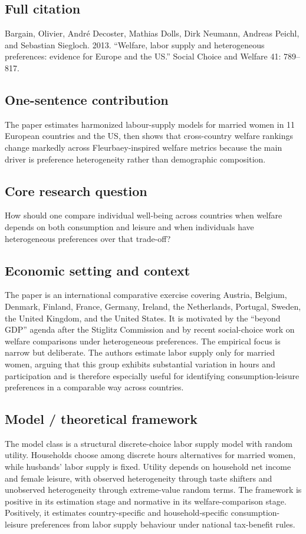 \documentclass[11pt,a4paper]{article}
\begin{document}
\subsection*{Full citation}
Bargain, Olivier, André Decoster, Mathias Dolls, Dirk Neumann, Andreas Peichl, and Sebastian Siegloch. 2013. “Welfare, labor supply and heterogeneous preferences: evidence for Europe and the US.” Social Choice and Welfare 41: 789–817.

\subsection*{One-sentence contribution}
The paper estimates harmonized labour-supply models for married women in 11 European countries and the US, then shows that cross-country welfare rankings change markedly across Fleurbaey-inspired welfare metrics because the main driver is preference heterogeneity rather than demographic composition.

\subsection*{Core research question}
How should one compare individual well-being across countries when welfare depends on both consumption and leisure and when individuals have heterogeneous preferences over that trade-off?

\subsection*{Economic setting and context}
The paper is an international comparative exercise covering Austria, Belgium, Denmark, Finland, France, Germany, Ireland, the Netherlands, Portugal, Sweden, the United Kingdom, and the United States. It is motivated by the “beyond GDP” agenda after the Stiglitz Commission and by recent social-choice work on welfare comparisons under heterogeneous preferences. The empirical focus is narrow but deliberate. The authors estimate labor supply only for married women, arguing that this group exhibits substantial variation in hours and participation and is therefore especially useful for identifying consumption-leisure preferences in a comparable way across countries.

\subsection*{Model / theoretical framework}
The model class is a structural discrete-choice labor supply model with random utility. Households choose among discrete hours alternatives for married women, while husbands’ labor supply is fixed. Utility depends on household net income and female leisure, with observed heterogeneity through taste shifters and unobserved heterogeneity through extreme-value random terms. The framework is positive in its estimation stage and normative in its welfare-comparison stage. Positively, it estimates country-specific and household-specific consumption-leisure preferences from labor supply behaviour under national tax-benefit rules.
\end{document}
